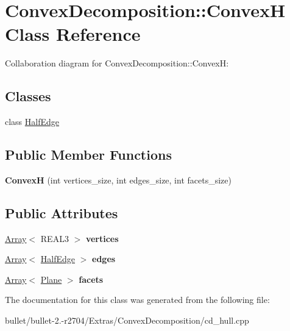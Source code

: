 \hypertarget{class_convex_decomposition_1_1_convex_h}{\section{Convex\+Decomposition\+:\+:Convex\+H Class Reference}
\label{class_convex_decomposition_1_1_convex_h}
}


Collaboration diagram for Convex\+Decomposition\+:\+:Convex\+H\+:
\subsection*{Classes}
\begin{DoxyCompactItemize}
\item 
class \hyperlink{class_convex_decomposition_1_1_convex_h_1_1_half_edge}{Half\+Edge}
\end{DoxyCompactItemize}
\subsection*{Public Member Functions}
\begin{DoxyCompactItemize}
\item 
\hypertarget{class_convex_decomposition_1_1_convex_h_a6eb50c88208f9acfcbeccdda32d4d516}{{\bfseries Convex\+H} (int vertices\+\_\+size, int edges\+\_\+size, int facets\+\_\+size)}\label{class_convex_decomposition_1_1_convex_h_a6eb50c88208f9acfcbeccdda32d4d516}

\end{DoxyCompactItemize}
\subsection*{Public Attributes}
\begin{DoxyCompactItemize}
\item 
\hypertarget{class_convex_decomposition_1_1_convex_h_a53074600acef68d9098b0833690cdfce}{\hyperlink{class_convex_decomposition_1_1_array}{Array}$<$ R\+E\+A\+L3 $>$ {\bfseries vertices}}\label{class_convex_decomposition_1_1_convex_h_a53074600acef68d9098b0833690cdfce}

\item 
\hypertarget{class_convex_decomposition_1_1_convex_h_a2ba21c3f37b19472b776c58221c04cfd}{\hyperlink{class_convex_decomposition_1_1_array}{Array}$<$ \hyperlink{class_convex_decomposition_1_1_convex_h_1_1_half_edge}{Half\+Edge} $>$ {\bfseries edges}}\label{class_convex_decomposition_1_1_convex_h_a2ba21c3f37b19472b776c58221c04cfd}

\item 
\hypertarget{class_convex_decomposition_1_1_convex_h_a49b2ef1047c51a496d2eabb9a9b5216d}{\hyperlink{class_convex_decomposition_1_1_array}{Array}$<$ \hyperlink{class_convex_decomposition_1_1_plane}{Plane} $>$ {\bfseries facets}}\label{class_convex_decomposition_1_1_convex_h_a49b2ef1047c51a496d2eabb9a9b5216d}

\end{DoxyCompactItemize}


The documentation for this class was generated from the following file\+:\begin{DoxyCompactItemize}
\item 
bullet/bullet-\/2.-\/r2704/\+Extras/\+Convex\+Decomposition/cd\+\_\+hull.\+cpp\end{DoxyCompactItemize}
